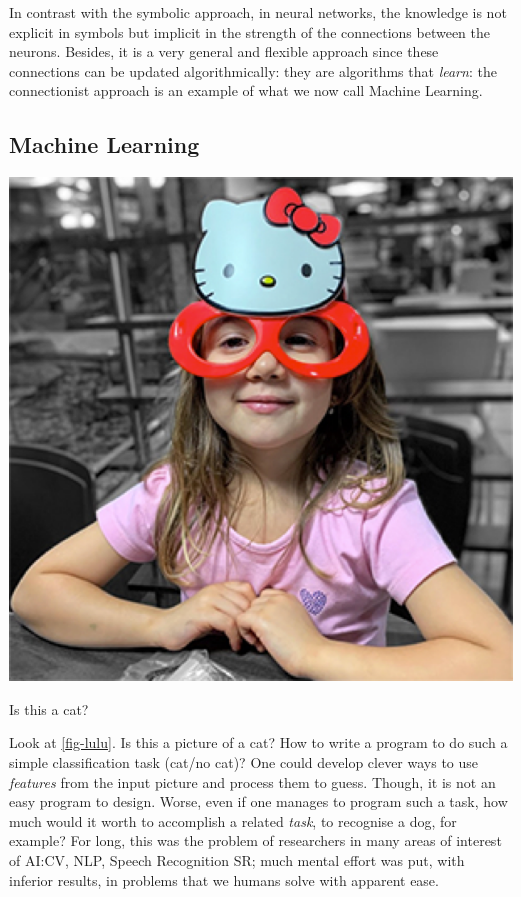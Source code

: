 \documentclass[
  letterpaper,
  DIV=11,
  numbers=noendperiod,
  oneside]{scrreprt}
\begin{document}
In contrast with the symbolic approach, in neural networks, the
knowledge is not explicit in symbols but implicit in the strength of the
connections between the neurons. Besides, it is a very general and
flexible approach since these connections can be updated
algorithmically: they are algorithms that \emph{learn}: the
connectionist approach is an example of what we now call Machine
Learning.

\hypertarget{machine-learning}{%
\subsection{Machine Learning}\label{machine-learning}}

\begin{marginfigure}

{\centering \includegraphics{imgs/lulu.png}

}

\caption{\label{fig-lulu}Is this a cat?}

\end{marginfigure}

Look at \protect\hyperlink{fig-lulu}{{[}fig-lulu{]}}. Is this a picture
of a cat? How to write a program to do such a simple classification task
(cat/no cat)? One could develop clever ways to use \emph{features} from
the input picture and process them to guess. Though, it is not an easy
program to design. Worse, even if one manages to program such a task,
how much would it worth to accomplish a related \emph{task}, to
recognise a dog, for example? For long, this was the problem of
researchers in many areas of interest of AI:{CV}, {NLP}, Speech
Recognition {SR}; much mental effort was put, with inferior results, in
problems that we humans solve with apparent ease.
\end{document}
